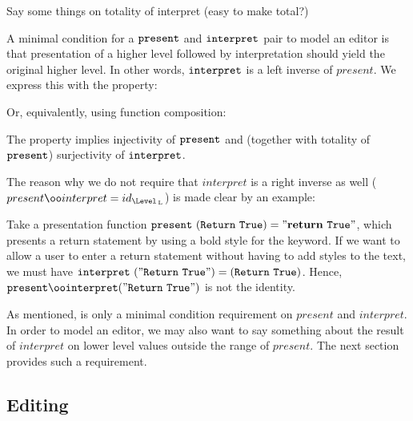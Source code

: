 
\toHere
Say some things on totality of interpret (easy to make total?)
\fromHere


A minimal condition for a ${\tt present}$ and ${\tt interpret}$ pair to model an editor is that presentation of a higher level followed by interpretation should yield the original higher level. In other words, ${\tt interpret}$ is a left inverse of $present$. We express this with the  property: 


Or, equivalently, using function composition:


The  property implies injectivity of ${\tt present}$ and (together with totality of ${\tt present}$) surjectivity of ${\tt interpret}$. 

The reason why we do not require that $interpret$ is a right inverse as well ($present \oo interpret = id_{\Level\L}$) is made clear by an example:

Take a presentation function ${\tt present}~({\tt Return~True}) = {\tt "{\bf return}~True"}$, which presents a return statement by using a bold style for the keyword. If we want to allow a user to enter a return statement without having to add styles to the text, we must have ${\tt interpret}~({\tt "Return~True"}) = ({\tt Return~True})$. 
Hence, $\present \oo \interpret ({\tt "Return~True"}) $ is not the identity.


As mentioned,  is only a minimal condition requirement on $present$ and $interpret$. In order to model an editor, we may also want to say something about the result of $interpret$ on lower level values outside the range of $present$. The next section provides such a requirement.




\subsection{Editing}\label{sect:single_Editing}

